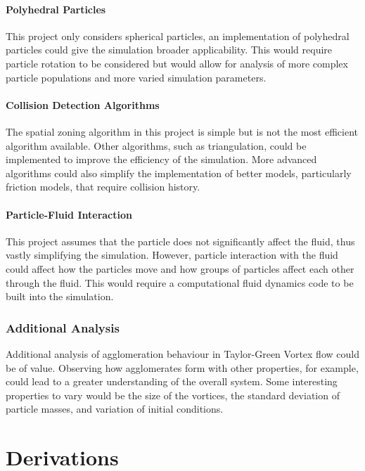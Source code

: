 \documentclass[a4paper,11pt,titlepage]{report}
\begin{document}
\subsubsection{Polyhedral Particles}
This project only considers spherical particles, an implementation of polyhedral particles could give the simulation broader applicability. This would require particle rotation to be considered but would allow for analysis of more complex particle populations and more varied simulation parameters.
\subsubsection{Collision Detection Algorithms}
The spatial zoning algorithm in this project is simple but is not the most efficient algorithm available. Other algorithms, such as triangulation\cite{dynamictriangulations}, could be implemented to improve the efficiency of the simulation. More advanced algorithms could also simplify the implementation of better models, particularly friction models, that require collision history.
\subsubsection{Particle-Fluid Interaction}
This project assumes that the particle does not significantly affect the fluid, thus vastly simplifying the simulation. However, particle interaction with the fluid could affect how the particles move and how groups of particles affect each other through the fluid. This would require a computational fluid dynamics code to be built into the simulation.
\subsection{Additional Analysis}
Additional analysis of agglomeration behaviour in Taylor-Green Vortex flow could be of value. Observing how agglomerates form with other properties, for example, could lead to a greater understanding of the overall system. Some interesting properties to vary would be the size of the vortices, the standard deviation of particle masses, and variation of initial conditions.
\appendix
\chapter{Derivations}
\label{ch:Derivations}
\end{document}
